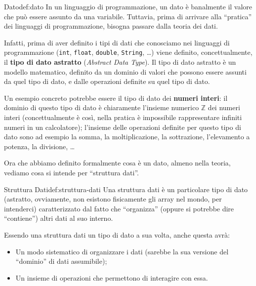 \documentclass[12pt]{report}
\begin{document}
    \begin{definizione}{Dato}{def:dato}
    	In un linguaggio di programmazione, un dato è banalmente il valore che può essere assunto da una variabile. Tuttavia, prima di arrivare alla ``pratica'' dei linguaggi di programmazione, bisogna passare dalla teoria dei dati.
    	
    	Infatti, prima di aver definito i tipi di dati che conosciamo nei linguaggi di programmazione (\texttt{int}, \texttt{float}, \texttt{double}, \texttt{String}, \dots) viene definito, concettualmente, il \textbf{tipo di dato astratto} (\textit{Abstract Data Type}). Il tipo di dato astratto è un modello matematico, definito da un dominio di valori che possono essere assunti da quel tipo di dato, e dalle operazioni definite su quel tipo di dato. 
    	
    	Un esempio concreto potrebbe essere il tipo di dato dei \textbf{numeri interi}: il dominio di questo tipo di dato è chiaramente l'insieme numerico $\mathbb{Z}$ dei numeri interi (concettualmente è così, nella pratica è impossibile rappresentare infiniti numeri in un calcolatore); l'insieme delle operazioni definite per questo tipo di dato sono ad esempio la somma, la moltiplicazione, la sottrazione, l'elevamento a potenza, la divisione, \dots
    \end{definizione}
    
    Ora che abbiamo definito formalmente cosa è un dato, almeno nella teoria, vediamo cosa si intende per ``struttura dati''.
    
    \begin{definizione}{Struttura Dati}{def:struttura-dati}
    	Una struttura dati è un particolare tipo di dato (astratto, ovviamente, non esistono fisicamente gli array nel mondo, per intenderci) caratterizzato dal fatto che ``organizza'' (oppure si potrebbe dire ``contiene'') altri dati al suo interno.
    	
    	Essendo una struttura dati un tipo di dato a sua volta, anche questa avrà:
    	\begin{itemize}
    		\item Un modo sistematico di organizzare i dati (sarebbe la sua versione del ``dominio'' di dati assumibile);
    		\item Un insieme di operazioni che permettono di interagire con essa.
    	\end{itemize}
    \end{definizione}
    
\end{document}
